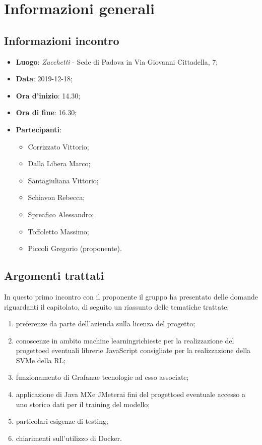 \section{Informazioni generali}
    \subsection{Informazioni incontro}
        \begin{itemize}
            \item \textbf{Luogo}: \textit{Zucchetti} - Sede di Padova in Via Giovanni Cittadella, 7;
            \item \textbf{Data}: 2019-12-18;
            \item \textbf{Ora d'inizio}: 14.30;
            \item \textbf{Ora di fine}: 16.30;
            \item \textbf{Partecipanti}: \begin{itemize}
                \item Corrizzato Vittorio;
                \item Dalla Libera Marco;
                \item Santagiuliana Vittorio;
                \item Schiavon Rebecca;
                \item Spreafico Alessandro;
                \item Toffoletto Massimo;
                \item Piccoli Gregorio (proponente).
            \end{itemize}
        \end{itemize}
    \subsection{Argomenti trattati}
        In questo primo incontro con il proponente il gruppo ha presentato delle domande riguardanti il capitolato\glo, di seguito un riassunto delle tematiche trattate:
        \begin{enumerate}
            \item preferenze da parte dell'azienda sulla licenza del progetto\glo;
            \item conoscenze in ambito machine learning\glosp richieste per la realizzazione del progetto\glosp ed eventuali librerie JavaScript consigliate per la             realizzazione della SVM\glosp e della RL\glo;
            \item funzionamento di Grafana\glosp e tecnologie ad esso associate;
            \item applicazione di Java MX\glosp e JMeter\glosp ai fini del progetto\glosp ed eventuale accesso a uno storico dati per il training del modello;
            \item particolari esigenze di testing;
            \item chiarimenti sull'utilizzo di Docker.
        \end{enumerate}
